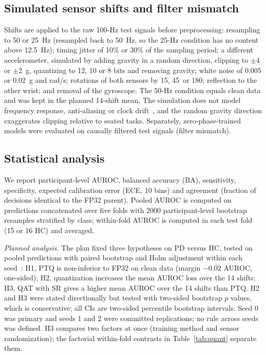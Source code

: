 \documentclass[preprint,12pt]{elsarticle}
\begin{document}
\subsection{Simulated sensor shifts and filter mismatch}
Shifts are applied to the raw 100-Hz test signals before preprocessing: resampling to 50 or 25~Hz (resampled back to 50~Hz, so the 25-Hz condition has no content above 12.5~Hz); timing jitter of 10\% or 30\% of the sampling period; a different accelerometer, simulated by adding gravity in a random direction, clipping to $\pm4$ or $\pm2$~g, quantizing to 12, 10 or 8 bits and removing gravity; white noise of 0.005 or 0.02~g and rad/s; rotations of both sensors by 15\textdegree, 45\textdegree\ or 180\textdegree; reflection to the other wrist; and removal of the gyroscope. The 50-Hz condition equals clean data and was kept in the planned 14-shift mean. The simulation does not model frequency response, anti-aliasing or clock drift~\cite{CoyleAsbil2026}, and the random gravity direction exaggerates clipping relative to seated tasks. Separately, zero-phase-trained models were evaluated on causally filtered test signals (filter mismatch).

\subsection{Statistical analysis}
We report participant-level AUROC, balanced accuracy (BA), sensitivity, specificity, expected calibration error (ECE, 10 bins) and agreement (fraction of decisions identical to the FP32 parent). Pooled AUROC is computed on predictions concatenated over five folds with 2000 participant-level bootstrap resamples stratified by class; within-fold AUROC is computed in each test fold (15 or 16 HC) and averaged.

\emph{Planned analysis.} The plan fixed three hypotheses on PD versus HC, tested on pooled predictions with paired bootstrap and Holm adjustment within each seed~\cite{Holm1979}: H1, PTQ is non-inferior to FP32 on clean data (margin $-0.02$ AUROC, one-sided); H2, quantization increases the mean AUROC loss over the 14 shifts; H3, QAT with SR gives a higher mean AUROC over the 14 shifts than PTQ. H2 and H3 were stated directionally but tested with two-sided bootstrap $p$ values, which is conservative; all CIs are two-sided percentile bootstrap intervals. Seed 0 was primary and seeds 1 and 2 were committed replications; no rule across seeds was defined. H3 compares two factors at once (training method and sensor randomization); the factorial within-fold contrasts in Table~\ref{tab:quant} separate them.
\end{document}
